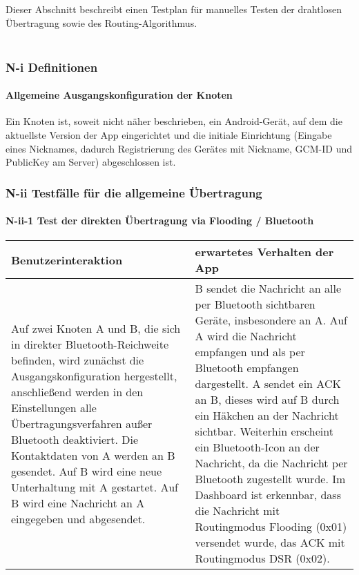 
Dieser Abschnitt beschreibt einen Testplan für manuelles Testen der
drahtlosen Übertragung sowie des Routing-Algorithmus.\\\\


\subsubsection{N-i Definitionen}

\paragraph{Allgemeine Ausgangskonfiguration der Knoten}

Ein Knoten ist, soweit nicht näher beschrieben, ein Android-Gerät, auf dem die aktuellste Version der App eingerichtet und die initiale Einrichtung (Eingabe eines Nicknames, dadurch Registrierung des Gerätes mit Nickname, GCM-ID und PublicKey am Server) abgeschlossen ist.



\subsubsection{N-ii Testfälle für die allgemeine Übertragung}

\paragraph{N-ii-1 Test der direkten Übertragung via Flooding / Bluetooth}

\begin{longtable}{p{8cm}p{8.5cm}}
\toprule
Benutzerinteraktion & erwartetes Verhalten der App\tabularnewline
\midrule
\endhead
Auf zwei Knoten A und B, die sich in direkter Bluetooth-Reichweite
befinden, wird zunächst die Ausgangskonfiguration hergestellt,
anschließend werden in den Einstellungen alle Übertragungsverfahren
außer Bluetooth deaktiviert. Die Kontaktdaten von A werden an B
gesendet. Auf B wird eine neue Unterhaltung mit A gestartet. Auf B wird
eine Nachricht an A eingegeben und abgesendet. & B sendet die Nachricht
an alle per Bluetooth sichtbaren Geräte, insbesondere an A. Auf A wird
die Nachricht empfangen und als per Bluetooth empfangen dargestellt. A
sendet ein ACK an B, dieses wird auf B durch ein Häkchen an der
Nachricht sichtbar. Weiterhin erscheint ein Bluetooth-Icon an der
Nachricht, da die Nachricht per Bluetooth zugestellt wurde. Im Dashboard
ist erkennbar, dass die Nachricht mit Routingmodus Flooding (0x01)
versendet wurde, das ACK mit Routingmodus DSR (0x02).\tabularnewline
\bottomrule
\end{longtable}

